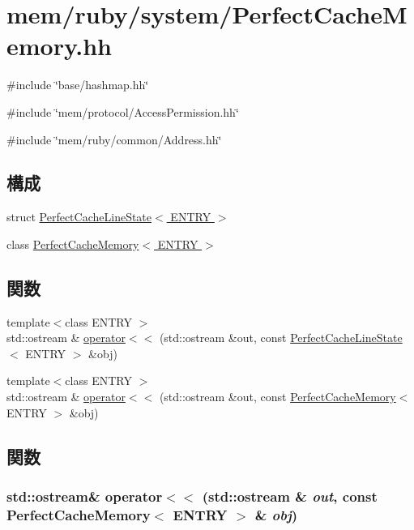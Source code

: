 \hypertarget{PerfectCacheMemory_8hh}{
\section{mem/ruby/system/PerfectCacheMemory.hh}
\label{PerfectCacheMemory_8hh}
}
{\ttfamily \#include \char`\"{}base/hashmap.hh\char`\"{}}\par
{\ttfamily \#include \char`\"{}mem/protocol/AccessPermission.hh\char`\"{}}\par
{\ttfamily \#include \char`\"{}mem/ruby/common/Address.hh\char`\"{}}\par
\subsection*{構成}
\begin{DoxyCompactItemize}
\item 
struct \hyperlink{structPerfectCacheLineState}{PerfectCacheLineState$<$ ENTRY $>$}
\item 
class \hyperlink{classPerfectCacheMemory}{PerfectCacheMemory$<$ ENTRY $>$}
\end{DoxyCompactItemize}
\subsection*{関数}
\begin{DoxyCompactItemize}
\item 
{\footnotesize template$<$class ENTRY $>$ }\\std::ostream \& \hyperlink{PerfectCacheMemory_8hh_a63aca6cc5fb299399f4e932efbc959d4}{operator$<$$<$} (std::ostream \&out, const \hyperlink{structPerfectCacheLineState}{PerfectCacheLineState}$<$ ENTRY $>$ \&obj)
\item 
{\footnotesize template$<$class ENTRY $>$ }\\std::ostream \& \hyperlink{PerfectCacheMemory_8hh_aa0612ca0612d4e8d2b5a72e5b40c18e7}{operator$<$$<$} (std::ostream \&out, const \hyperlink{classPerfectCacheMemory}{PerfectCacheMemory}$<$ ENTRY $>$ \&obj)
\end{DoxyCompactItemize}


\subsection{関数}
\hypertarget{PerfectCacheMemory_8hh_aa0612ca0612d4e8d2b5a72e5b40c18e7}{
\subsubsection[{operator$<$$<$}]{\setlength{\rightskip}{0pt plus 5cm}std::ostream\& operator$<$$<$ (std::ostream \& {\em out}, \/  const {\bf PerfectCacheMemory}$<$ ENTRY $>$ \& {\em obj})}}
\label{PerfectCacheMemory_8hh_aa0612ca0612d4e8d2b5a72e5b40c18e7}



